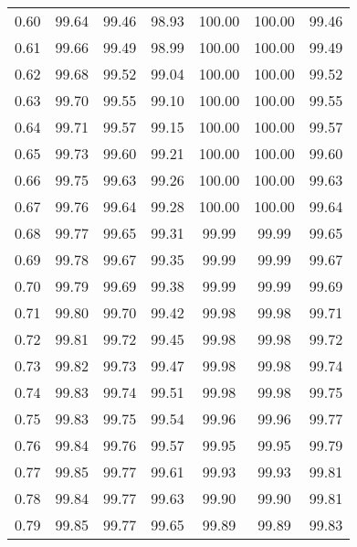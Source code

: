 \begin{tabular}{|c|c|c|c|c|c|c|}
      0.60 &     99.64 &     99.46 &      98.93 &  100.00 &     100.00 &         99.46 \\
      0.61 &     99.66 &     99.49 &      98.99 &  100.00 &     100.00 &         99.49 \\
      0.62 &     99.68 &     99.52 &      99.04 &  100.00 &     100.00 &         99.52 \\
      0.63 &     99.70 &     99.55 &      99.10 &  100.00 &     100.00 &         99.55 \\
      0.64 &     99.71 &     99.57 &      99.15 &  100.00 &     100.00 &         99.57 \\
      0.65 &     99.73 &     99.60 &      99.21 &  100.00 &     100.00 &         99.60 \\
      0.66 &     99.75 &     99.63 &      99.26 &  100.00 &     100.00 &         99.63 \\
      0.67 &     99.76 &     99.64 &      99.28 &  100.00 &     100.00 &         99.64 \\
      0.68 &     99.77 &     99.65 &      99.31 &   99.99 &      99.99 &         99.65 \\
      0.69 &     99.78 &     99.67 &      99.35 &   99.99 &      99.99 &         99.67 \\
      0.70 &     99.79 &     99.69 &      99.38 &   99.99 &      99.99 &         99.69 \\
      0.71 &     99.80 &     99.70 &      99.42 &   99.98 &      99.98 &         99.71 \\
      0.72 &     99.81 &     99.72 &      99.45 &   99.98 &      99.98 &         99.72 \\
      0.73 &     99.82 &     99.73 &      99.47 &   99.98 &      99.98 &         99.74 \\
      0.74 &     99.83 &     99.74 &      99.51 &   99.98 &      99.98 &         99.75 \\
      0.75 &     99.83 &     99.75 &      99.54 &   99.96 &      99.96 &         99.77 \\
      0.76 &     99.84 &     99.76 &      99.57 &   99.95 &      99.95 &         99.79 \\
      0.77 &     99.85 &     99.77 &      99.61 &   99.93 &      99.93 &         99.81 \\
      0.78 &     99.84 &     99.77 &      99.63 &   99.90 &      99.90 &         99.81 \\
      0.79 &     99.85 &     99.77 &      99.65 &   99.89 &      99.89 &         99.83 \\

\end{tabular}
